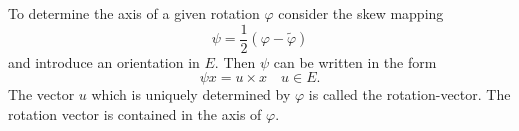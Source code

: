 To determine the axis of a given rotation $\varphi$ consider the skew mapping
$$\psi = \frac{1}{2}(\varphi - \tilde{\varphi})$$
and introduce an orientation in $E$. Then $\psi$ can be written in the form
$$\psi x = u \times x \quad u \in E.$$
The vector $u$ which is uniquely determined by $\varphi$ is called the rotation-vector. The rotation vector is contained in the axis of $\varphi$.
